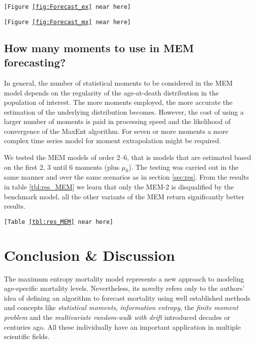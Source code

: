 \documentclass[T0_MEM]{subfiles}
\begin{document}
\begin{center}\texttt{[Figure \ref{fig:Forecast_ex} near here]}\end{center}

\begin{center}\texttt{[Figure \ref{fig:Forecast_mx} near here]}\end{center}



\subsection{How many moments to use in MEM forecasting?}

In general, the number of statistical moments to be considered in the MEM model depends on the regularity of the age-at-death distribution in the population of interest. The more moments employed, the more accurate the estimation of the underlying distribution becomes. However, the cost of using a larger number of moments is paid in processing speed and the likelihood of convergence of the MaxEnt algorithm. For seven or more moments a more complex time series model for moment extrapolation might be required.

We tested the MEM models of order 2--6, that is models that are estimated based on the first 2, 3 until 6 moments (plus $\mu_0$). The testing was carried out in the same manner and over the same scenarios as in section \ref{sec:res}. From the results in table \ref{tbl:res_MEM} we learn that only the MEM-2 is disqualified by the benchmark model, all the other variants of the MEM return significantly better results.

\begin{center}\texttt{[Table \ref{tbl:res_MEM} near here]}\end{center}



\section{Conclusion \& Discussion}\label{sec:conclusion}

The maximum entropy mortality model represents a new approach to modeling age-specific mortality levels. Nevertheless, its novelty refers only to the authors' idea of defining an algorithm to forecast mortality using well established methods and concepts like \emph{statistical moments}, \emph{information entropy}, the \emph{finite moment problem} and the \emph{multivariate random-walk with drift} introduced decades or centuries ago. All these individually have an important application in multiple scientific fields.
\end{document}
